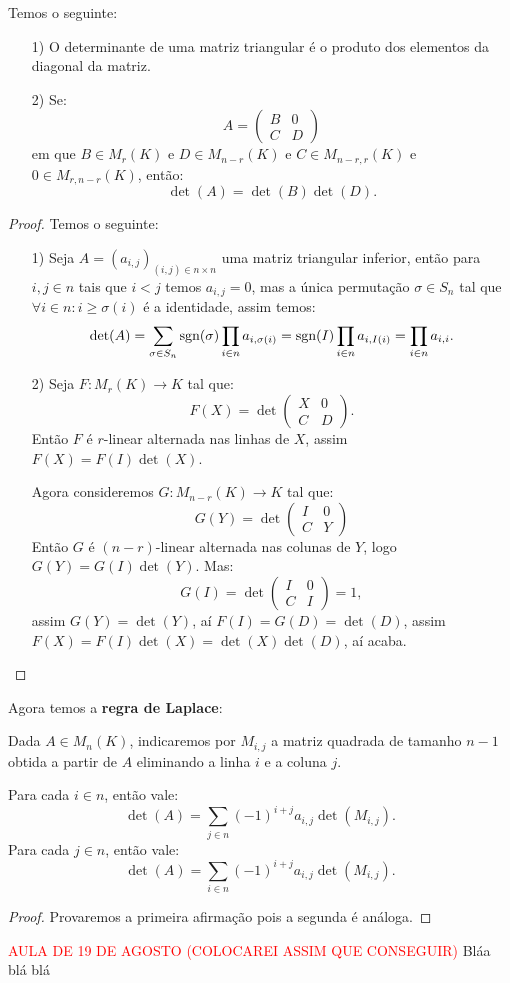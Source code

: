 \documentclass[11pt,twoside,a4paper]{book}
\begin{document}
\begin{proposicao}
Temos o seguinte:
\begin{itemize}
\item[1)] O determinante de uma matriz triangular é o produto dos elementos da diagonal da matriz.
\item[2)] Se:
\[
A=\begin{pmatrix}
B&0\\C&D
\end{pmatrix}
\]
em que $B\in M_r(K)$ e $D\in M_{n-r}(K)$ e $C\in M_{n-r,r}(K)$ e $0\in M_{r,n-r}(K)$, então:
\[
\det(A)=\det(B)\det(D).
\]
\end{itemize}
\end{proposicao}
\begin{proof}
Temos o seguinte:
\begin{itemize}
\item[1)] Seja $A=(a_{i,j})_{(i,j)\in n\times n}$ uma matriz triangular inferior, então para $i,j\in n$ tais que $i<j$ temos $a_{i,j}=0$, mas a única permutação $\sigma\in S_n$ tal que $\forall i\in n:i\geq\sigma(i)$ é a identidade, assim temos:
\[
\det(A)=\sum_{\sigma\in S_n}\operatorname{\textrm{sgn}}(\sigma)\prod_{i\in n}a_{i,\sigma(i)}=\operatorname{\textrm{sgn}}(I)\prod_{i\in n}a_{i,I(i)}=\prod_{i\in n}a_{i,i}.
\]
\item[2)] Seja $F:M_r(K)\rightarrow K$ tal que:
\[
F(X)=\det\begin{pmatrix}
X&0\\C&D
\end{pmatrix}.
\]
Então $F$ é $r$-linear alternada nas linhas de $X$, assim $F(X)=F(I)\det(X)$.

\medskip
\noindent
Agora consideremos $G:M_{n-r}(K)\rightarrow K$ tal que:
\[
G(Y)=\det\begin{pmatrix}
I&0\\C&Y
\end{pmatrix}
\]
Então $G$ é $(n-r)$-linear alternada nas colunas de $Y$, logo $G(Y)=G(I)\det(Y)$. Mas:
\[
G(I)=\det\begin{pmatrix}
I&0\\C&I
\end{pmatrix}=1,
\]
assim $G(Y)=\det(Y)$, aí $F(I)=G(D)=\det(D)$, assim $F(X)=F(I)\det(X)=\det(X)\det(D)$, aí acaba.
\end{itemize}
\end{proof}

\noindent
Agora temos a \textbf{regra de Laplace}:

\begin{teorema}
Dada $A\in M_n(K)$, indicaremos por $M_{i,j}$ a matriz quadrada de tamanho $n-1$ obtida a partir de $A$ eliminando a linha $i$ e a coluna $j$.

\smallskip
\noindent
Para cada $i\in n$, então vale:
\[
\det(A)=\sum_{j\in n}(-1)^{i+j}a_{i,j}\det(M_{i,j}).
\]
Para cada $j\in n$, então vale:
\[
\det(A)=\sum_{i\in n}(-1)^{i+j}a_{i,j}\det(M_{i,j}).
\]
\end{teorema}
\begin{proof}
Provaremos a primeira afirmação pois a segunda é análoga.
\end{proof}
\textcolor{red}{AULA DE 19 DE AGOSTO (COLOCAREI ASSIM QUE CONSEGUIR)}
Bláa blá blá
\end{document}
